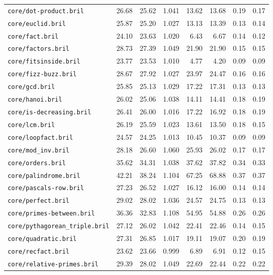 \begin{longtable}{p{48mm}rrrrrrr}
\nolinkurl{core/dot-product.bril} & 26.68 & 25.62 & 1.041 & 13.62 & 13.68 & 0.19 & 0.17 \\
\nolinkurl{core/euclid.bril} & 25.87 & 25.20 & 1.027 & 13.13 & 13.39 & 0.13 & 0.14 \\
\nolinkurl{core/fact.bril} & 24.10 & 23.63 & 1.020 & 6.43 & 6.67 & 0.14 & 0.12 \\
\nolinkurl{core/factors.bril} & 28.73 & 27.39 & 1.049 & 21.90 & 21.90 & 0.15 & 0.15 \\
\nolinkurl{core/fitsinside.bril} & 23.77 & 23.53 & 1.010 & 4.77 & 4.20 & 0.09 & 0.09 \\
\nolinkurl{core/fizz-buzz.bril} & 28.67 & 27.92 & 1.027 & 23.97 & 24.47 & 0.16 & 0.16 \\
\nolinkurl{core/gcd.bril} & 25.85 & 25.13 & 1.029 & 17.22 & 17.31 & 0.13 & 0.13 \\
\nolinkurl{core/hanoi.bril} & 26.02 & 25.06 & 1.038 & 14.11 & 14.41 & 0.18 & 0.19 \\
\nolinkurl{core/is-decreasing.bril} & 26.41 & 26.00 & 1.016 & 17.22 & 16.92 & 0.18 & 0.19 \\
\nolinkurl{core/lcm.bril} & 26.19 & 25.59 & 1.023 & 13.61 & 13.50 & 0.18 & 0.15 \\
\nolinkurl{core/loopfact.bril} & 24.57 & 24.25 & 1.013 & 10.45 & 10.37 & 0.09 & 0.09 \\
\nolinkurl{core/mod_inv.bril} & 28.18 & 26.60 & 1.060 & 25.93 & 26.02 & 0.17 & 0.17 \\
\nolinkurl{core/orders.bril} & 35.62 & 34.31 & 1.038 & 37.62 & 37.82 & 0.34 & 0.33 \\
\nolinkurl{core/palindrome.bril} & 42.21 & 38.24 & 1.104 & 67.25 & 68.88 & 0.37 & 0.37 \\
\nolinkurl{core/pascals-row.bril} & 27.23 & 26.52 & 1.027 & 16.12 & 16.00 & 0.14 & 0.14 \\
\nolinkurl{core/perfect.bril} & 29.02 & 28.02 & 1.036 & 24.57 & 24.75 & 0.13 & 0.13 \\
\nolinkurl{core/primes-between.bril} & 36.36 & 32.83 & 1.108 & 54.95 & 54.88 & 0.26 & 0.26 \\
\nolinkurl{core/pythagorean_triple.bril} & 27.12 & 26.02 & 1.042 & 22.41 & 22.46 & 0.14 & 0.15 \\
\nolinkurl{core/quadratic.bril} & 27.31 & 26.85 & 1.017 & 19.11 & 19.07 & 0.20 & 0.19 \\
\nolinkurl{core/recfact.bril} & 23.62 & 23.66 & 0.999 & 6.89 & 6.91 & 0.12 & 0.15 \\
\nolinkurl{core/relative-primes.bril} & 29.39 & 28.02 & 1.049 & 22.69 & 22.44 & 0.22 & 0.22 \\

\end{longtable}
